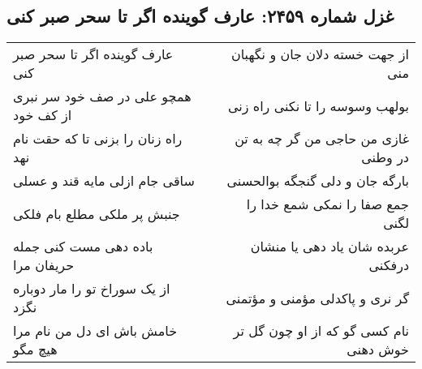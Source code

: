 \begin{center}
\section*{غزل شماره ۲۴۵۹: عارف گوینده اگر تا سحر صبر کنی}
\label{sec:2459}
\begin{longtable}{l p{0.5cm} r}
عارف گوینده اگر تا سحر صبر کنی
&&
از جهت خسته دلان جان و نگهبان منی
\\
همچو علی در صف خود سر نبری از کف خود
&&
بولهب وسوسه را تا نکنی راه زنی
\\
راه زنان را بزنی تا که حقت نام نهد
&&
غازی من حاجی من گر چه به تن در وطنی
\\
ساقی جام ازلی مایه قند و عسلی
&&
بارگه جان و دلی گنجگه بوالحسنی
\\
جنبش پر ملکی مطلع بام فلکی
&&
جمع صفا را نمکی شمع خدا را لگنی
\\
باده دهی مست کنی جمله حریفان مرا
&&
عربده شان یاد دهی یا منشان درفکنی
\\
از یک سوراخ تو را مار دوباره نگزد
&&
گر نری و پاکدلی مؤمنی و مؤتمنی
\\
خامش باش ای دل من نام مرا هیچ مگو
&&
نام کسی گو که از او چون گل تر خوش دهنی
\\
\end{longtable}
\end{center}
